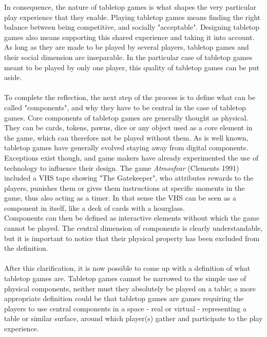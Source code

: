 In consequence, the nature of tabletop games is what shapes the very particular play experience that they enable. Playing tabletop games means finding the right balance between being competitive, and socially "acceptable". Designing tabletop games also means supporting this shared experience and taking it into account. As long as they are made to be played by several players, tabletop games and their social dimension are inseparable. In the particular case of tabletop games meant to be played by only one player, this quality of tabletop games can be put aside.
\\\\
To complete the reflection, the next step of the process is to define what can be called "components", and why they have to be central in the case of tabletop games. Core components of tabletop games are generally thought as physical. They can be cards, tokens, pawns, dice or any object used as a core element in the game, which can therefore not be played without them. As is well known, tabletop games have generally evolved staying away from digital components. Exceptions exist though, and game makers have already experimented the use of technology to influence their design. The game \textit{Atmosfear} (Clements 1991) included a VHS tape showing "The Gatekeeper", who attributes rewards to the players, punishes them or gives them instructions at specific moments in the game, thus also acting as a timer. In that sense the VHS can be seen as a component in itself, like a deck of cards with a hourglass.\\
Components can then be defined as interactive elements without which the game cannot be played. The central dimension of components is clearly understandable, but it is important to notice that their physical property has been excluded from the definition.
\\\\
After this clarification, it is now possible to come up with a definition of what tabletop games are. Tabletop games cannot be narrowed to the simple use of physical components, neither must they absolutely be played on a table; a more appropriate definition could be that tabletop games are games requiring the players to use central components in a space - real or virtual - representing a table or similar surface, around which player(s) gather and participate to the play experience.
